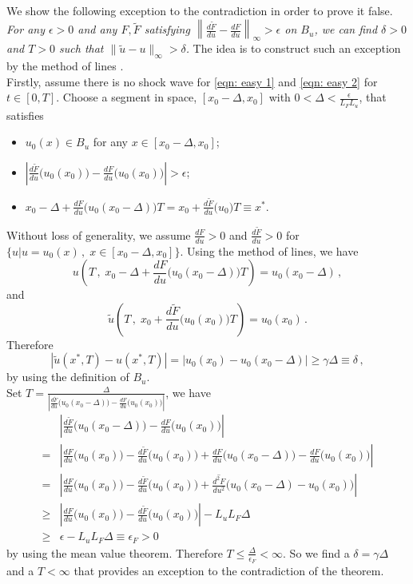 We show the following exception to the contradiction in order to prove it false.\\
\emph{For any $\epsilon >0$ and any $F,\tilde{F}$ satisfying $\left\|\frac{d\tilde{F}}{du} - \frac{dF}{du}\right\|_{\infty} > \epsilon$
on $B_u$, we can find $\delta >0$ and $T>0$ such that $\|\tilde{u} - u\|_\infty > \delta$.
}
The idea is to construct such an exception by the method of lines \cite{method of lines}.\\

Firstly, assume there is no shock wave for \eqref{eqn: easy 1} and \eqref{eqn: easy 2} for $t\in[0,T]$. 
Choose a segment in space, $[x_0-\Delta, x_0]$ with $0< \Delta< \frac{\epsilon}{L_{F} L_{u}}$, that satisfies 
\begin{itemize}
    \item $u_0(x) \in B_u$ for any $x\in [x_0-\Delta, x_0]$;
    \item $\left| \frac{d\tilde{F}}{du}\big(u_0(x_0)\big) - \frac{dF}{du} \big(u_0(x_0)\big) \right| > \epsilon$;
    \item $x_0 - \Delta + \frac{dF}{du}\big( u_0(x_0 - \Delta) \big) T = x_0 + \frac{d\tilde{F}}{du}\big( u_0 \big)T \equiv x^*$.
\end{itemize}
Without loss of generality, we assume $\frac{dF}{du} >0$ and $\frac{d\tilde{F}}{du}>0$ for $\big\{u \big|u=u_0(x)\,,\; x\in[x_0-\Delta, x_0]\big\}$.
Using the method of lines, we have
$$u\left(T\,,\; x_0-\Delta +\frac{dF}{du}\big( u_0(x_0-\Delta) \big)T  \right) = u_0(x_0 -\Delta)\,,$$ and
$$\tilde{u}\left(T\,,\; x_0+\frac{d\tilde{F}}{du}\big( u_0(x_0) \big)T  \right) = u_0(x_0 )\,.$$
Therefore
$$
    \left| \tilde{u}(x^*, T) - u(x^*, T) \right| = \left| u_0(x_0) - u_0(x_0-\Delta) \right| \ge \gamma \Delta \equiv \delta\,,
$$
by using the definition of $B_u$.\\

Set 
$T= \frac{\Delta}{\left| \frac{d\tilde{F}}{du}\big( u_0(x_0-\Delta)\big) - \frac{dF}{du}\big( u_0(x_0) \big) \right|}$, we have
\begin{equation*}\begin{split}
     & \left| \frac{d\tilde{F}}{du}\big( u_0(x_0-\Delta)\big) - \frac{dF}{du}\big( u_0(x_0) \big) \right| \\
    = &\left| \frac{d{F}}{du}\big( u_0(x_0)\big) - \frac{d\tilde{F}}{du}\big( u_0(x_0) \big) + 
           \frac{dF}{du} \big( u_0(x_0-\Delta) \big) - \frac{dF}{du}\big( u_0(x_0)\big) \right|\\
    = &\left| \frac{d{F}}{du}\big( u_0(x_0)\big) - \frac{d\tilde{F}}{du}\big( u_0(x_0) \big) + 
       \overline{\frac{d^2 F}{du^2}} \big( u_0(x_0-\Delta) - u_0(x_0) \big) \right|\\
    \ge& \left| \frac{dF}{du}\big( u_0(x_0) \big) - \frac{d\tilde{F}}{du}\big( u_0(x_0) \big) \right| - L_uL_F \Delta \\
    \ge& \epsilon - L_uL_F\Delta\equiv \epsilon_{F} > 0
\end{split}\end{equation*}
by using the mean value theorem. Therefore $T \le \frac{\Delta}{\epsilon_F} < \infty$.
So we find a $\delta = \gamma \Delta$ and a $T < \infty$ that provides an exception
to the contradiction of the theorem. 

